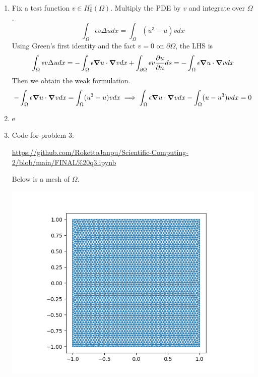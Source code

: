 \documentclass{article}
\newcommand{\ep}{\epsilon}
\newcommand{\imp}{\implies}
\newcommand{\ptl}{\partial}
\newcommand{\Om}{\Omega}
\begin{document}
\begin{enumerate}[label=(\alph*)]
	
\item
Fix a test function $v\in H_0^1(\Omega)$. Multiply the PDE by $v$ and integrate over $\Omega$.
$$\int_\Om \ep v\Delta udx = \int_\Om (u^3-u)vdx$$
Using Green's first identity and the fact $v=0$ on $\ptl\Om$, the LHS is
$$\int_\Om \ep v\Delta udx = -\int_\Om \ep\grad u\cdot\grad vdx + \int_{\ptl\Om} \ep v\pdv{u}{n}ds
= -\int_\Om \ep\grad u\cdot\grad vdx$$
Then we obtain the weak formulation.
$$-\int_\Om \ep\grad u\cdot\grad vdx = \int_\Om (u^3-u)vdx
\imp \int_\Om \ep\grad u\cdot\grad vdx - \int_\Om (u-u^3)vdx = 0$$


\item e


\item
Code for problem 3:

\url{https://github.com/RokettoJanpu/Scientific-Computing-2/blob/main/FINAL%20q3.ipynb}

Below is a mesh of $\Omega$.

\begin{center}
	\includegraphics[scale=.5]{FINAL q3 mesh}
\end{center}
\end{enumerate}
	
\end{document}

